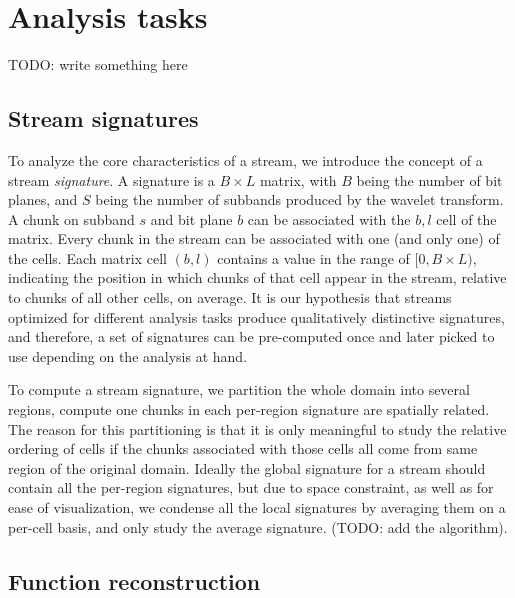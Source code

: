 \section{Analysis tasks}
TODO: write something here
\subsection{Stream signatures}
\label{sec:stream-signature}

To analyze the core characteristics of a stream, we introduce the concept of a stream
\emph{signature}. A signature is a $B \times L$ matrix, with $B$ being the number of bit planes, and
$S$ being the number of subbands produced by the wavelet transform. A chunk on subband $s$ and bit
plane $b$ can be associated with the $b, l$ cell of the matrix. Every chunk in the stream can be
associated with one (and only one) of the cells. Each matrix cell $(b,l)$ contains a value in the
range of $[0,B\times L)$, indicating the position in which chunks of that cell appear in the stream,
relative to chunks of all other cells, on average. It is our hypothesis that streams optimized for
different analysis tasks produce qualitatively distinctive signatures, and therefore, a set of
signatures can be pre-computed once and later picked to use depending on the analysis at hand.

To compute a stream signature, we partition the whole domain into several regions, compute one
chunks in each per-region signature are spatially related. The reason for this partitioning is that
it is only meaningful to study the relative ordering of cells if the chunks associated with those
cells all come from same region of the original domain. Ideally the global signature for a stream
should contain all the per-region signatures, but due to space constraint, as well as for ease of
visualization, we condense all the local signatures by averaging them on a per-cell basis, and only
study the average signature. (TODO: add the algorithm).

\subsection{Function reconstruction}
\label{sec:rmse-optimized}

